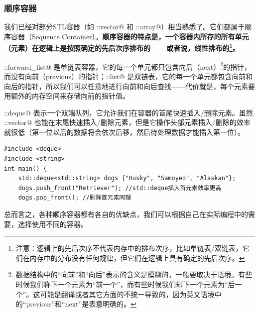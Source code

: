 \subsubsection*{顺序容器}
我们已经对部分STL容器（如 \lstinline@std::vector@ 和 \lstinline@std::array@）相当熟悉了。它们都属于顺序容器（Sequence Container）。\textbf{顺序容器的特点是，一个容器内所存的所有单元（元素）在逻辑上是按照确定的先后次序排布的——或者说，线性排布的\footnote{注意：逻辑上的先后次序不代表内存中的排布次序，比如单链表/双链表，它们在内存中的分布没有任何规律，但它们在逻辑上具有确定的先后次序。}。}\par
\lstinline@std::forward_list@ 是单链表容器，它的每一个单元都只包含向后（next）\footnote{数据结构中的``向前''和``向后''表示的含义是模糊的，一般要取决于语境。有些时候我们称下一个元素为``前一个''，而有些时候我们却下一个元素为``后一个''。这可能是翻译或者其它方面的不统一导致的，因为英文语境中的``previous''和``next''是表意明确的。}的指针，而没有向前（previous）的指针；\lstinline@std::list@ 是双链表，它的每一个单元都包含向前和向后的指针，所以我们可以任意地进行向前和向后查找——代价就是，每个元素要用额外的内存空间来存储向前的指针值。\par
\lstinline@std::deque@ 表示一个双端队列，它允许我们在容器的首尾快速插入/删除元素。虽然 \lstinline@std::vector@ 也能在末尾快速插入/删除元素，但是它操作头部元素插入/删除的效率就很低（第一位以后的数据将会依次后移，然后待处理数据才能插入第一位）。
\begin{lstlisting}
#include <deque>
#include <string>
int main() {
    std::deque<std::string> dogs {"Husky", "Samoyed", "Alaskan"};
    dogs.push_front("Retriever"); //std::deque插入首元素效率更高
    dogs.pop_front(); //删除首元素同理
\end{lstlisting}\par
总而言之，各种顺序容器都有各自的优缺点，我们可以根据自己在实际编程中的需要，选择使用不同的容器。\par
